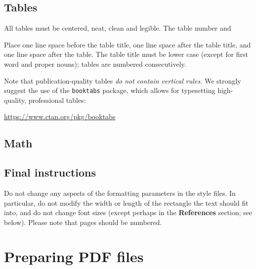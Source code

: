 \documentclass{article}
\begin{document}
\subsection{Tables}


All tables must be centered, neat, clean and legible.  The table number and


Place one line space before the table title, one line space after the
table title, and one line space after the table. The table title must
be lower case (except for first word and proper nouns); tables are
numbered consecutively.


Note that publication-quality tables \emph{do not contain vertical rules.} We
strongly suggest the use of the \verb+booktabs+ package, which allows for
typesetting high-quality, professional tables:
\begin{center}
  \url{https://www.ctan.org/pkg/booktabs}
\end{center}



\subsection{Math}

\subsection{Final instructions}

Do not change any aspects of the formatting parameters in the style files.  In
particular, do not modify the width or length of the rectangle the text should
fit into, and do not change font sizes (except perhaps in the
\textbf{References} section; see below). Please note that pages should be
numbered.


\section{Preparing PDF files}
\end{document}

